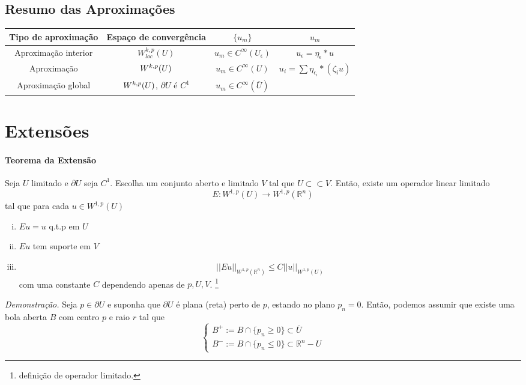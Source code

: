 \documentclass[11pt]{article}
\newcommand{\Rn}{{\mathbb{R}^n}}
\newcommand{\pu}{\partial U}
\newcommand{\e}{\epsilon}
\begin{document}
\subsection*{Resumo das Aproximações}

\begin{tabular}{cccc}
	\hline
	Tipo de aproximação & Espaço de convergência & \( \{u_m\} \)  & \( u_m \) \\
	\hline
	Aproximação interior	& \( W^{k,p}_{loc}(U) \) 	& \( u_m \in C^\infty(U_\e) \) & \( u_\e = \eta_\e * u \)\\
	
	Aproximação    			& \( W^{k,p}(U) \) 		& \( u_m \in C^\infty(U)  \) & \( u_i = \sum \eta_{\e_i} * (\zeta_i u) \) \\
	
	Aproximação global	 	& \( W^{k,p}(U)\), $ \pu $ é $ C^1 $		& \( u_m \in C^\infty(\overline{U}) \) &  \\
	\hline
\end{tabular}





\section{Extensões}

\paragraph{Teorema da Extensão} Seja \( U \) limitado e \( \pu \) seja \( C^1 \).  Escolha um conjunto aberto e limitado \( V \) tal que \( U \subset\subset V \). Então, existe um operador linear limitado \[ E:W^{1,p}(U) \rightarrow W^{1,p}(\Rn) \] tal que para cada \( u \in W^{1,p}(U) \) \begin{enumerate}[(i)]
	\item \( Eu=u \) q.t.p em \( U \)
	\item \( Eu \) tem suporte em \( V \)
	\item \[ ||Eu||_{W^{1,p}(\Rn)} \leq C ||u||_{W^{1,p}(U)} \] com uma constante \( C \) dependendo apenas de \( p, U, V \). \footnote{definição de operador limitado.}
\end{enumerate}

\textit{Demonstração.} Seja \( p \in \pu \) e suponha que \( \pu \) é plana (reta) perto de \( p \), estando no plano \( p_n=0 \). Então, podemos assumir que existe uma bola aberta \( B \) com centro \( p \) e raio \( r \) tal que \[ \begin{cases}
	B^+ := B \cap \{ p_n \geq 0 \}  \subset \overline{U}\\
	B^- := B \cap \{ p_n \leq 0 \} \subset \Rn - U 
\end{cases} \]
\end{document}
